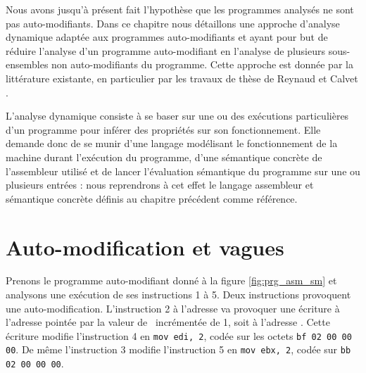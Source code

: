 Nous avons jusqu'à présent fait l'hypothèse que les programmes analysés ne sont pas auto-modifiants.
Dans ce chapitre nous détaillons une approche d'analyse dynamique adaptée aux programmes auto-modifiants et ayant pour but de réduire l'analyse d'un programme auto-modifiant en l'analyse de plusieurs sous-ensembles non auto-modifiants du programme.
Cette approche est donnée par la littérature existante, en particulier par les travaux de thèse de Reynaud \cite{Reynaud2010} et Calvet \cite{Calvet2013}.

L'analyse dynamique consiste à se baser sur une ou des exécutions particulières d'un programme pour inférer des propriétés sur son fonctionnement.
Elle demande donc de se munir d'une langage modélisant le fonctionnement de la machine durant l'exécution du programme, d'une sémantique concrète de l'assembleur utilisé et de lancer l'évaluation sémantique du programme sur une ou plusieurs entrées : nous reprendrons à cet effet le langage assembleur et sémantique concrète définis au chapitre précédent comme référence.

\section{Auto-modification et vagues}
Prenons le programme auto-modifiant donné à la figure \ref{fig:prg_asm_sm} et analysons une exécution de ses instructions 1 à 5.
Deux instructions provoquent une auto-modification.
L'instruction 2 à l'adresse  va provoquer une écriture à l'adresse pointée par la valeur de \eax\ incrémentée de 1, soit à l'adresse . Cette écriture modifie l'instruction 4 en \texttt{mov edi, 2}, codée sur les octets \texttt{bf 02 00 00 00}. De même l'instruction 3 modifie l'instruction 5 en \texttt{mov ebx, 2}, codée sur \texttt{bb 02 00 00 00}.
 
